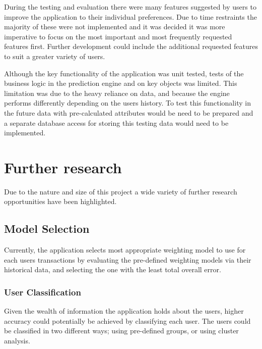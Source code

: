 During the testing and evaluation there were many features suggested by users to improve the application to their individual preferences. Due to time restraints the majority of these were not implemented and it was decided it was more imperative to focus on the most important and most frequently requested features first. Further development could include the additional requested features to suit a greater variety of users.

Although the key functionality of the application was unit tested, tests of the business logic in the prediction engine and on key objects was limited. This limitation was due to the heavy reliance on data, and because the engine performs differently depending on the users history. To test this functionality in the future data with pre-calculated attributes would be need to be prepared and a separate database access for storing this testing data would need to be implemented.

\begin{comment}
SELECT user_id, MAX(  `dateposted` ) , MIN(  `dateposted` ) , DATEDIFF( MAX(  `dateposted` ) , MIN(  `dateposted` ) ) /30
FROM transaction
GROUP BY  `user_id` 
ORDER BY DATEDIFF( MAX(  `dateposted` ) , MIN(  `dateposted` ) ) ASC 
\end{comment}

\section{Further research}
Due to the nature and size of this project a wide variety of further research opportunities have been highlighted.

\subsection{Model Selection}
Currently, the application selects most appropriate weighting model to use for each users transactions by evaluating the pre-defined weighting models via their historical data, and selecting the one with the least total overall error.

\subsubsection{User Classification}
Given the wealth of information the application holds about the users, higher accuracy could potentially be achieved by classifying each user. The users could be classified in two different ways; using pre-defined groups, or using cluster analysis. 

